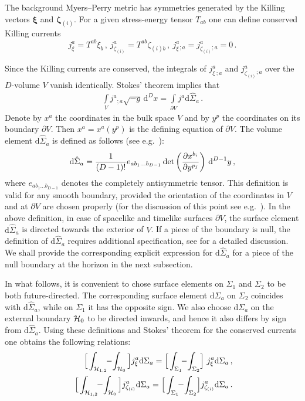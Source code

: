 \documentclass[superscriptaddress,twocolumn,showpacs,
preprintnumbers,amsmath,amssymb,nofootinbib,
longbibliography,aps,prd,10pt]{revtex4-1}
\newcommand{\ts}[1]{{\boldsymbol{#1}}}         %
\newcommand{\dd}{\mbox{d}}
\newcommand{\be}{\begin{equation}}             %
\newcommand{\ee}{\end{equation}}               %
\newcommand{\ba}{\begin{eqnarray}}             %
\newcommand{\ea}{\end{eqnarray}}               %
\newcommand{\n}[1]{\label{#1}}
\begin{document}
The background Myers--Perry metric has symmetries generated by the Killing vectors $\ts{\xi}$ and $\ts{\zeta}_{(i)}$. For a given stress-energy tensor $T_{ab}$ one can define conserved Killing currents
\be\n{jjjj}
j_{\xi}^a=T^{ab}\xi_b\, ,\
j_{\zeta_{(i)}}^a=T^{ab}\zeta_{(i) b}\, , \
j_\xi^a{}_{;a}=j_{\zeta_{(i)}}^a{}_{;a}=0\, .
\ee

Since the Killing currents are conserved, the integrals of $j_{\xi\ ;a}^a$ and $j_{\zeta_{(i)}}^a{}_{;a}$ over the $D$-volume $V$ vanish identically. Stokes' theorem implies that
\begin{align}
\int\limits_V j^{a}{}_{;a} \sqrt{-g} \, \dd^D x=\int\limits_{\partial V} j^a \dd\hat{\Sigma}_a\, .
\end{align}
Denote by $x^a$ the coordinates in the bulk space $V$ and by $y^p$ the coordinates on its  boundary $\partial V$. Then $x^a=x^a(y^p)$ is the defining equation of $\partial V$. The volume element $\dd\hat{\Sigma}_a$ is defined as follows (see e.g.~\cite{frolov1998black}):
\begin{align}
\dd\hat{\Sigma}_a={1\over (D-1)!} e_{a b_1\ldots b_{D-1}} \det\left( {\partial x^{b_i}\over \partial y^{p_j}}\right) \, \dd^{D-1}y\, ,
\end{align}
where $e_{a b_1 \dots b_{D-1}}$ denotes the completely antisymmetric tensor. This definition is valid for any smooth boundary, provided the orientation of the coordinates in $V$ and at $\partial V$ are chosen properly (for the discussion of this point see e.g.~\cite{Poisson:2004}).
In the above definition, in case of spacelike and timelike surfaces $\partial V$, the surface element $\dd\hat{\Sigma}_a$ is directed towards the exterior of $V$. If a piece of the boundary is null, the definition of $\dd\hat{\Sigma}_a$ requires additional specification, see \cite{Poisson:2004} for a detailed discussion. We shall provide the corresponding explicit expression for $\dd\hat{\Sigma}_a$ for a piece of the null boundary at the horizon in the next subsection.

In what follows, it is convenient to chose surface elements on $\Sigma_1$ and $\Sigma_2$ to be both future-directed. The corresponding surface element $\dd\Sigma_a$ on $\Sigma_2$ coincides with $\dd\hat{\Sigma}_a$, while on $\Sigma_1$ it has the opposite sign. We also choose $\dd\Sigma_a$ on the external boundary ${\cal H}_0$ to be directed inwards, and hence it also differs by sign from $\dd\hat{\Sigma}_a$. Using these definitions and Stokes' theorem for the conserved currents one obtains the following relations:
\ba
&& \!\!\!\! \Big[\int_{ {\cal H}_{1,2}} \!\!-\! \int_{ {\cal H}_0}\Big] j_{\xi}^a \dd \Sigma_a=
\Big[\int_{ \Sigma_{1}}\!\!-\!\int_{\Sigma_{2}} \!\Big] \ j_{\xi}^a \dd\Sigma_a \, ,\n{HSxi}\\
&& \!\!\!\! \Big[\int_{ {\cal H}_{1,2}} \!\!-\! \int_{ {\cal H}_0}\Big] j_{\zeta_{(i)}}^a \dd\Sigma_a=
\Big[\int_{ \Sigma_{1}} \!\!-\! \int_{\Sigma_{2}} \! \Big] j_{\zeta_{(i)}}^a \dd\Sigma_a\, .\n{HSze}
\ea
\end{document}
